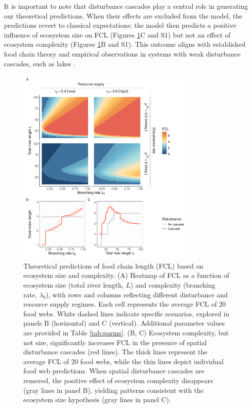 \documentclass[11pt, class=article, crop=false]{standalone}
\begin{document}
It is important to note that disturbance cascades play a central role in generating our theoretical predictions.
When their effects are excluded from the model, the predictions revert to classical expectations; the model then predicts a positive influence of ecosystem size on FCL (Figures \ref{fig:sim-main}C and S1) but not an effect of ecosystem complexity (Figures \ref{fig:sim-main}B and S1).
This outcome aligns with established food chain theory \citep{holt_food_2002, takimoto_effects_2012, terui_spatial_2019} and empirical observations in systems with weak disturbance cascades, such as lakes \citep{post_ecosystem_2000, takimoto_ecosystem_2008, doi_resource_2009}.

\begin{figure}
    \centering
    \includegraphics[width=0.8\textwidth]{output/fig_theo_main.pdf}
    \caption{Theoretical predictions of food chain length (FCL) based on ecosystem size and complexity. (A) Heatmap of FCL as a function of ecosystem size (total river length, $L$) and complexity (branching rate, $\lambda_b$), with rows and columns reflecting different disturbance and resource supply regimes. Each cell represents the average FCL of 20 food webs. White dashed lines indicate specific scenarios, explored in panels B (horizontal) and C (vertical). Additional parameter values are provided in Table \ref{tab:parms}. (B, C) Ecosystem complexity, but not size, significantly increases FCL in the presence of spatial disturbance cascades (red lines). The thick lines represent the average FCL of 20 food webs, while the thin lines depict individual food web predictions. When spatial disturbance cascades are removed, the positive effect of ecosystem complexity disappears (gray lines in panel B), yielding patterns consistent with the ecosystem size hypothesis (gray lines in panel C).}
    \label{fig:sim-main}
\end{figure}
\end{document}
